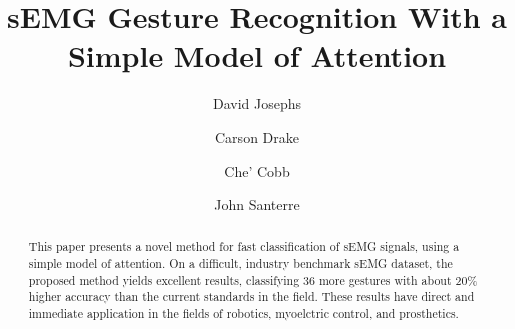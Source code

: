\documentclass{llncs}
\title{sEMG Gesture Recognition With a Simple Model of Attention}
\author{%
David Josephs\inst{1} \and
Carson Drake\inst{1} \and
Che' Cobb\inst{1} \and
John Santerre\inst{1} %
}
\institute{%
Master of Science in Data Science, Southern Methodist University,
Dallas TX 75275 USA 
\email{\{josephsd, drakec, cobbc\}@smu.edu} %
}
\begin{document}
\maketitle              %

\setcounter{footnote}{0}

\begin{abstract}
This paper presents a novel method for fast classification of sEMG signals, using a simple model of attention. On a difficult, industry benchmark sEMG dataset, the proposed method yields excellent results, classifying 36 more gestures with about 20\% higher accuracy than the current standards in the field. These results have direct and immediate application in the fields of robotics, myoelctric control, and prosthetics.
\end{abstract}




\pagebreak






 
 
%
\end{document}
